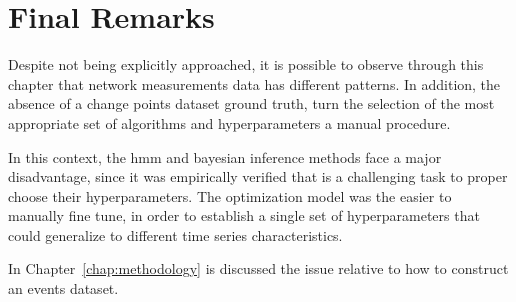 \section{Final Remarks}

Despite not being explicitly approached, it is possible to observe
through this chapter
that network measurements data has different patterns.
In addition, the absence of a change points dataset ground truth, turn the
selection of the most appropriate set of algorithms and hyperparameters
a manual procedure.

In this context, the \gls*{hmm} and bayesian inference methods face a major
disadvantage, since it was empirically verified that is a challenging task to
proper choose their hyperparameters.
The optimization model was the easier to manually fine tune,
in order to establish a single set of hyperparameters that could
generalize to different time series characteristics.

In Chapter~\ref{chap:methodology} is discussed the issue relative to how to
construct an events dataset.
